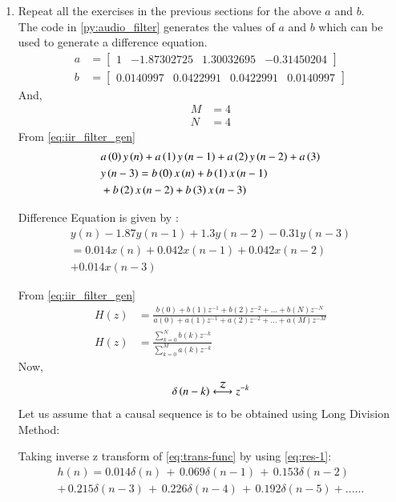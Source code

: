 \documentclass[journal,12pt,twocolumn]{IEEEtran}
\theoremstyle{remark}
\renewcommand\thesection{\arabic{section}}
\numberwithin{equation}{subsection}
\begin{document}
\begin{enumerate}[label=\thesection.\arabic*]
\item Repeat all the exercises in the previous sections for the above $a$ and $b$.\\
\solution The code in \ref{py:audio_filter} generates the values of $a$ and $b$  which can be used to generate a difference equation.
\begin{align}
a &= \begin{bmatrix}
1 & -1.87302725 & 1.30032695 & -0.31450204 
\end{bmatrix}\nonumber\\
b &= \begin{bmatrix}
0.0140997 & 0.0422991 & 0.0422991 & 0.0140997 
\end{bmatrix}\nonumber
\end{align}
And,
\begin{align}
    M &= 4\\
    N&=4
\end{align}
From \ref{eq:iir_filter_gen} 
\begin{align}
    &a\left(0\right)y\left(n\right) + a\left(1\right)y\left(n-1\right)+a\left(2\right)y\left(n-2\right)+a\left(3\right)\notag\\ \notag &y\left(n-3\right) =   b\left(0\right)x\left(n\right) + b\left(1\right)x\left(n-1\right)\\ \notag &+b\left(2\right)x\left(n-2\right)+b\left(3\right)x\left(n-3\right) 
\end{align}

Difference Equation is given by :
\begin{multline}
      y(n) - 1.87 y(n - 1) + 1.3 y(n - 2) - 0.31 y(n - 3) \nonumber \\
	= 0.014 x(n) + 0.042 x(n - 1) + 0.042 x(n - 2) \\\nonumber
        + 0.014 x(n - 3) 
\end{multline}

From \eqref{eq:iir_filter_gen} 
\begin{align}
    H(z) &= \frac{b(0) + b(1) z^{-1} + b(2) z^{-2} + \ldots + b(N) z^{-N}}{a(0) + a(1) z^{-1} + a(2) z^{-2} + \ldots + a(M) z^{-M}}\\
    H(z) &= \frac{\sum_{k = 0}^{N}b(k)z^{-k}}{\sum_{k = 0}^{M}a(k)z^{-k}} \label{eq:trans-func}
\end{align}
Now,
\begin{align}
    \delta\brak{n-k} \system{Z} z^{-k}\label{eq:res-1}
\end{align}
Let us assume that a causal sequence is to be obtained using Long Division Method:

Taking inverse z transform of \eqref{eq:trans-func} by using \eqref{eq:res-1}:
\begin{multline}
h(n) = 0.014\delta(n) \,+\, 0.069 \delta(n - 1)\, +\, 0.153\delta(n - 2) \\ + \,0.215\delta(n - 3) \,+ \, 0.226\delta(n - 4) \,+\, 0.192 \delta(n - 5) + ......
\end{multline}


\end{enumerate}
\end{document}

